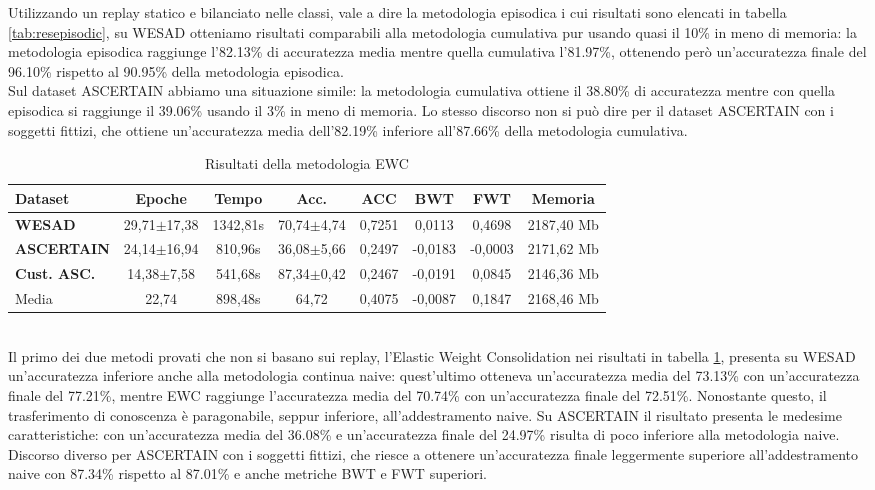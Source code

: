 Utilizzando un replay statico e bilanciato nelle classi, vale a dire la metodologia episodica i cui risultati sono elencati in tabella \ref{tab:resepisodic}, su WESAD otteniamo risultati comparabili alla metodologia cumulativa pur usando quasi il 10\% in meno di memoria: la metodologia episodica raggiunge l'82.13\% di accuratezza media mentre quella cumulativa l'81.97\%, ottenendo però un'accuratezza finale del 96.10\% rispetto al 90.95\% della metodologia episodica.\\
Sul dataset ASCERTAIN abbiamo una situazione simile: la metodologia cumulativa ottiene il 38.80\% di accuratezza mentre con quella episodica si raggiunge il 39.06\% usando il 3\% in meno di memoria. Lo stesso discorso non si può dire per il dataset ASCERTAIN con i soggetti fittizi, che ottiene un'accuratezza media dell'82.19\% inferiore all'87.66\% della metodologia cumulativa.
\begin{table}[h]
\footnotesize
    \begin{tabular}{l|c|c|c|c|c|c|c}
        \textbf{Dataset} & \textbf{Epoche} & \textbf{Tempo} & \textbf{Acc.} & \textbf{ACC} & \textbf{BWT} & \textbf{FWT} & \textbf{Memoria}\\
        \hline
        \textbf{WESAD} & 29,71$\pm$17,38 & 1342,81s & 70,74$\pm$4,74 & 0,7251 & 0,0113 & 0,4698 & 2187,40 Mb\\
        \textbf{ASCERTAIN} & 24,14$\pm$16,94 & 810,96s & 36,08$\pm$5,66 & 0,2497 & -0,0183 & -0,0003 & 2171,62 Mb\\
        \textbf{Cust. ASC.} & 14,38$\pm$7,58 & 541,68s & 87,34$\pm$0,42 & 0,2467 & -0,0191 & 0,0845 & 2146,36 Mb\\
        \hline
        Media & 22,74 & 898,48s & 64,72 & 0,4075 & -0,0087 & 0,1847 & 2168,46 Mb
    \end{tabular}
    \caption{Risultati della metodologia EWC}
    \label{tab:resewc}
\end{table}\\
Il primo dei due metodi provati che non si basano sui replay, l'Elastic Weight Consolidation nei risultati in tabella \ref{tab:resewc}, presenta su WESAD un'accuratezza inferiore anche alla metodologia continua naive: quest'ultimo otteneva un'accuratezza media del 73.13\% con un'accuratezza finale del 77.21\%, mentre EWC raggiunge l'accuratezza media del 70.74\% con un'accuratezza finale del 72.51\%. Nonostante questo, il trasferimento di conoscenza è paragonabile, seppur inferiore, all'addestramento naive. Su ASCERTAIN il risultato presenta le medesime caratteristiche: con un'accuratezza media del 36.08\% e un'accuratezza finale del 24.97\% risulta di poco inferiore alla metodologia naive. Discorso diverso per ASCERTAIN con i soggetti fittizi, che riesce a ottenere un'accuratezza finale leggermente superiore all'addestramento naive con 87.34\% rispetto al 87.01\% e anche metriche BWT e FWT superiori.
